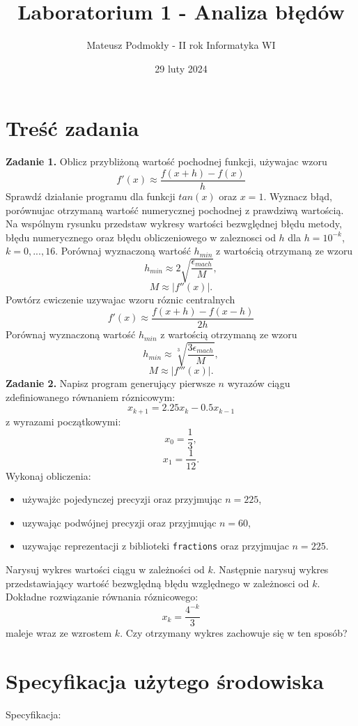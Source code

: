 \documentclass[11pt]{scrartcl}
\title{Laboratorium 1 - Analiza błędów}
\author{Mateusz Podmokły - II rok Informatyka WI}
\date{29 luty 2024}
\begin{document}
    \maketitle
    \section{Treść zadania}
    \textbf{Zadanie 1.} Oblicz przybliżoną wartość pochodnej funkcji,
    używajac wzoru
    \[
        f'(x) \approx \frac{f(x+h) - f(x)}{h}
    \]
    Sprawdź działanie programu dla funkcji $tan(x)$ oraz $x = 1$.
    Wyznacz błąd, porównujac otrzymaną wartość numerycznej pochodnej
    z prawdziwą wartością. Na wspólnym rysunku przedstaw wykresy
    wartości bezwględnej błędu metody, błędu numerycznego oraz
    błędu obliczeniowego w zaleznosci od $h$ dla $h=10^{-k}$,
    $k = 0,...,16$. Porównaj wyznaczoną wartość $h_{min}$ z wartością
    otrzymaną ze wzoru
    \[
        h_{min} \approx 2\sqrt{\frac{\epsilon_{mach}}{M}},
    \]
    \[
        M \approx \left|f''(x)\right|.
    \]
    Powtórz cwiczenie uzywajac wzoru róznic centralnych
    \[
        f'(x) \approx \frac{f(x+h) - f(x-h)}{2h}
    \]
    Porównaj wyznaczoną wartość $h_{min}$ z wartością
    otrzymaną ze wzoru
    \[
        h_{min} \approx \sqrt[3]{\frac{3\epsilon_{mach}}{M}},
    \]
    \[
        M \approx \left|f'''(x)\right|.
    \]
    \textbf{Zadanie 2.} Napisz program generujący pierwsze $n$
    wyrazów ciągu zdefiniowanego równaniem róznicowym:
    \[
        x_{k+1}=2.25x_k-0.5x_{k-1}
    \]
    z wyrazami początkowymi:
    \[
        x_0=\frac{1}{3},
    \]
    \[
        x_1=\frac{1}{12}.
    \]
    Wykonaj obliczenia:
    \begin{itemize}
        \item używajżc pojedynczej precyzji oraz przyjmując $n = 225$,
        \item uzywając podwójnej precyzji oraz przyjmując $n = 60$,
        \item uzywając reprezentacji z biblioteki \texttt{fractions}
            oraz przyjmujac $n = 225$.
    \end{itemize}
    Narysuj wykres wartości ciągu w zależności od $k$. Następnie
    narysuj wykres przedstawiający wartość bezwględną błędu
    względnego w zależnosci od $k$. \\
    Dokładne rozwiązanie równania róznicowego:
    \[
        x_k=\frac{4^{-k}}{3}
    \]
    maleje wraz ze wzrostem $k$. Czy otrzymany wykres zachowuje
    się w ten sposób?

    \section{Specyfikacja użytego środowiska}
    Specyfikacja:
\end{document}

